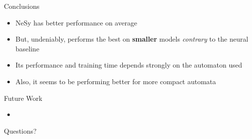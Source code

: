 \documentclass[10pt, aspectratio=169]{beamer}
\begin{document}
\begin{frame}{Conclusions}
    \begin{itemize}
        \setlength{\itemsep}{13pt}
        \item NeSy has better performance on average
        \item But, undeniably, performs the best on \textbf{smaller} models \textit{contrary} to the neural baseline
        \item Its performance and training time depends strongly on the automaton used
        \item Also, it seems to be performing better for more compact automata
        \end{itemize}
    \end{frame}

\begin{frame}{Future Work}
    \begin{itemize}
        \setlength{\itemsep}{13pt}
        \item
        \end{itemize}
    \end{frame}
 
\begin{frame}
    \begin{center}
        \huge {} 
        
        Questions?
    \end{center}
    
\end{frame}
\end{document}

